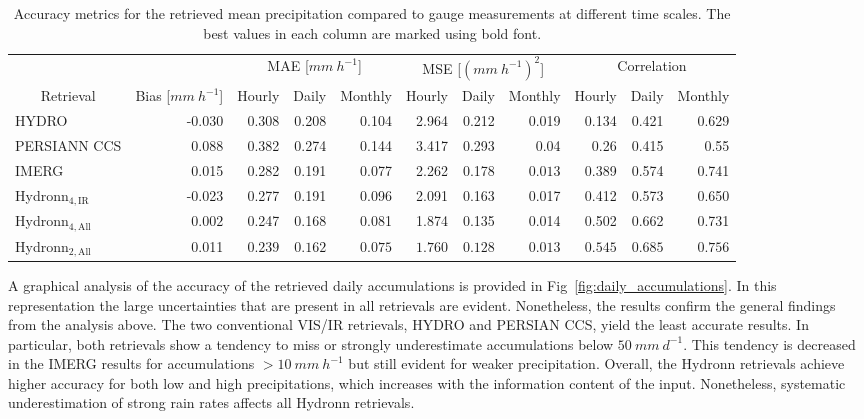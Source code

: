 \documentclass[journal abbreviation, manuscript]{copernicus}
\newcommand{\hydronntwo}{Hydronn$_{2, \text{All}}$}
\newcommand{\hydronnfourall}{Hydronn$_{4, \text{All}}$}
\newcommand{\hydronnfourir}{Hydronn$_{4, \text{IR}}$}
\begin{document}
\begin{table}[hbpt!]
  \caption{Accuracy metrics for the retrieved mean precipitation compared to gauge measurements
    at different time scales. The best values in each column are marked using bold font.}
  \label{tab:metrics}
  \begin{tabular}{l|r|rrr|rrr|rrr}
        & &
        \multicolumn{3}{c|}{MAE [$\unit{mm\ h^{-1}}$]} &
        \multicolumn{3}{c|}{MSE [$(\unit{mm\ h^{-1}})^2$]} &
        \multicolumn{3}{c}{Correlation} \\
        \multicolumn{1}{c|}{Retrieval} &
        \multicolumn{1}{c|}{Bias [$\unit{mm\ h^{-1}}$]} &
        Hourly & Daily & Monthly &
        Hourly & Daily & Monthly &
        Hourly & Daily & Monthly \\
        \hline
        HYDRO & -0.030 &
        0.308 & 0.208  & 0.104 &
        2.964 & 0.212  & 0.019 &
        0.134 & 0.421 & 0.629 \\
        PERSIANN CCS & 0.088 &
        0.382 & 0.274 & 0.144 &
        3.417 & 0.293 & 0.04 &        
        0.26  & 0.415 & 0.55 \\
        IMERG & 0.015 &
        0.282 & 0.191 & 0.077 &
        2.262 & 0.178 & $\mathbf{0.013}$ &
        0.389 & 0.574 & 0.741 \\


        \hydronnfourir{} & -0.023 &
        0.277 & 0.191 & 0.096 &       
        2.091 &  0.163 &  0.017 &
        0.412 & 0.573 & 0.650 \\

        \hydronnfourall{} & $\mathbf{0.002}$ &
        0.247 & 0.168 & 0.081 &
        1.874 & 0.135 & 0.014 &
        0.502 & 0.662 & 0.731 \\

        \hydronntwo{}   &  0.011 &
        $\mathbf{0.239}$ & $\mathbf{0.162}$ & $\mathbf{0.075}$ &
        $\mathbf{1.760}$ & $\mathbf{0.128}$ & $\mathbf{0.013}$ &
        $\mathbf{0.545}$ & $\mathbf{0.685}$ & $\mathbf{0.756}$ \\
  \end{tabular}
\end{table}

A graphical analysis of the accuracy of the retrieved daily accumulations is
provided in Fig~\ref{fig:daily_accumulations}. In this representation the large
uncertainties that are present in all retrievals are evident. Nonetheless, the
results confirm the general findings from the analysis above. The two
conventional VIS/IR retrievals, HYDRO and PERSIAN CCS, yield the least accurate
results. In particular, both retrievals show a tendency to miss or strongly
underestimate accumulations below $50\ \unit{mm\ d^{-1}}$. This tendency is
decreased in the IMERG results for accumulations $> 10\ \unit{mm\ h^{-1}}$ but
still evident for weaker precipitation. Overall, the Hydronn retrievals achieve
higher accuracy for both low and high precipitations, which increases with the
information content of the input. Nonetheless, systematic underestimation of
strong rain rates affects all Hydronn retrievals.
\end{document}
